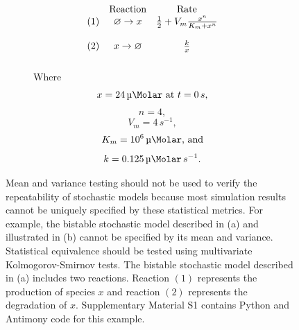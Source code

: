 \documentclass[journal,transmag,twoside]{IEEEtran}
\begin{document}
\begin{figure}
  \centering
  \begin{subfigure}[b]{0.5\textwidth}
    \centering
    \[
    \begin{array}{c c c}
       & \textrm{Reaction} & \textrm{Rate} \\
      \left( 1 \right) & \varnothing \to x & \frac{1}{2} + V_m \frac{x^n}{K_m + x^n} \\ \\
      \left( 2 \right) & x \to \varnothing & \frac{k}{x} \\ \\
    \end{array}
    \]
    Where
    \[
      x = 24\,\SI{}{\micro\Molar} ~ \textrm{at} ~ t = 0\,s,
    \]
    \[
      n = 4,
    \]
    \[
      V_m = 4\,s^{-1},
    \]
    \[
      K_m = 10^6\,\SI{}{\micro\Molar}\text{, and}
    \]
    \[
      k = 0.125\,\SI{}{\micro\Molar}\,s^{-1}.
    \]
    \vspace{1em}
  \end{subfigure}%
  \begin{subfigure}[b]{0.5\textwidth}
    \centering
    
  \end{subfigure}
  \caption{Mean and variance testing should not be used to verify the repeatability of stochastic models because most simulation results cannot be uniquely specified by these statistical metrics. For example, the bistable stochastic model described in (a) and illustrated in (b) cannot be specified by its mean and variance. Statistical equivalence should be tested using multivariate Kolmogorov-Smirnov tests. The bistable stochastic model described in (a) includes two reactions. Reaction $\left( 1 \right)$ represents the production of species $x$ and reaction $\left( 2 \right)$ represents the degradation of $x$. Supplementary Material S1 contains Python and Antimony \cite{smith2009antimony} code for this example.}
  \label{fig_bistable_plot}
\end{figure}
\end{document}
